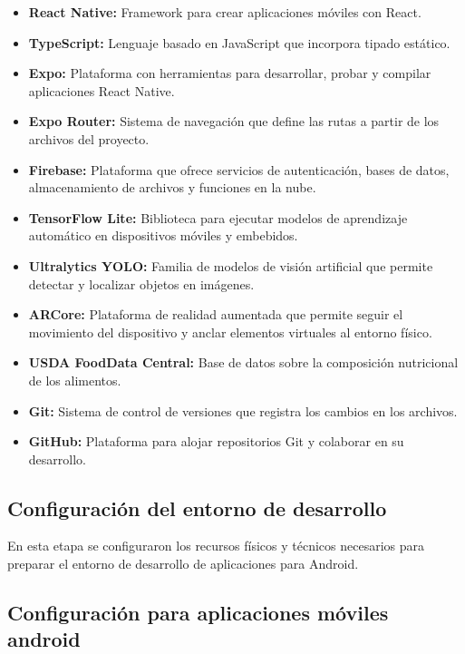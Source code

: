 \begin{itemize}
    \item \textbf{React Native:} Framework para crear aplicaciones móviles con React.
    \item \textbf{TypeScript:} Lenguaje basado en JavaScript que incorpora tipado estático.
    \item \textbf{Expo:} Plataforma con herramientas para desarrollar, probar y compilar aplicaciones React Native.
    \item \textbf{Expo Router:} Sistema de navegación que define las rutas a partir de los archivos del proyecto.
    \item \textbf{Firebase:} Plataforma que ofrece servicios de autenticación, bases de datos, almacenamiento de archivos y funciones en la nube.
    \item \textbf{TensorFlow Lite:} Biblioteca para ejecutar modelos de aprendizaje automático en dispositivos móviles y embebidos.
    \item \textbf{Ultralytics YOLO:} Familia de modelos de visión artificial que permite detectar y localizar objetos en imágenes.
    \item \textbf{ARCore:} Plataforma de realidad aumentada que permite seguir el movimiento del dispositivo y anclar elementos virtuales al entorno físico.
    \item \textbf{USDA FoodData Central:} Base de datos sobre la composición nutricional de los alimentos.
    \item \textbf{Git:} Sistema de control de versiones que registra los cambios en los archivos.
    \item \textbf{GitHub:} Plataforma para alojar repositorios Git y colaborar en su desarrollo.
\end{itemize}

\subsection{Configuración del entorno de desarrollo}

En esta etapa se configuraron los recursos físicos y técnicos necesarios 
para preparar el entorno de desarrollo de aplicaciones para Android.

\subsection{Configuración para aplicaciones móviles android}

